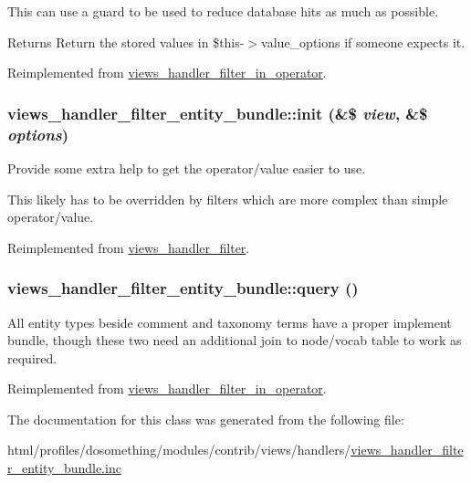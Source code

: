 This can use a guard to be used to reduce database hits as much as possible.

\begin{DoxyReturn}{Returns}
Return the stored values in \$this-\/$>$value\_\-options if someone expects it. 
\end{DoxyReturn}


Reimplemented from \hyperlink{classviews__handler__filter__in__operator_aa5b5df6d90f4359ed28c0c446bdc81a6}{views\_\-handler\_\-filter\_\-in\_\-operator}.\hypertarget{classviews__handler__filter__entity__bundle_aec203c1ccc0f4189a1fba3fae621ce9c}{
\subsubsection[{init}]{\setlength{\rightskip}{0pt plus 5cm}views\_\-handler\_\-filter\_\-entity\_\-bundle::init (\&\$ {\em view}, \/  \&\$ {\em options})}}
\label{classviews__handler__filter__entity__bundle_aec203c1ccc0f4189a1fba3fae621ce9c}
Provide some extra help to get the operator/value easier to use.

This likely has to be overridden by filters which are more complex than simple operator/value. 

Reimplemented from \hyperlink{classviews__handler__filter_a4c1eb0bdb4f81b5a2b2de137e1ffe2cd}{views\_\-handler\_\-filter}.\hypertarget{classviews__handler__filter__entity__bundle_a383511f8da47317cb77498e2705b9470}{
\subsubsection[{query}]{\setlength{\rightskip}{0pt plus 5cm}views\_\-handler\_\-filter\_\-entity\_\-bundle::query ()}}
\label{classviews__handler__filter__entity__bundle_a383511f8da47317cb77498e2705b9470}
All entity types beside comment and taxonomy terms have a proper implement bundle, though these two need an additional join to node/vocab table to work as required. 

Reimplemented from \hyperlink{classviews__handler__filter__in__operator_af4b9a596ad1e6fbee116977ca0a7d8a9}{views\_\-handler\_\-filter\_\-in\_\-operator}.

The documentation for this class was generated from the following file:\begin{DoxyCompactItemize}
\item 
html/profiles/dosomething/modules/contrib/views/handlers/\hyperlink{views__handler__filter__entity__bundle_8inc}{views\_\-handler\_\-filter\_\-entity\_\-bundle.inc}\end{DoxyCompactItemize}
